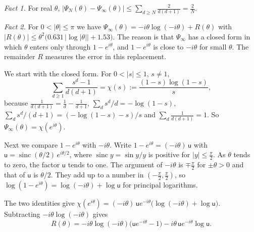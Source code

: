 \emph{Fact 1.} For real $\theta$,
$\lvert\Psi_N(\theta)-\Psi_\infty(\theta)\rvert\le\sum_{d\ge N}\frac2{d(d+1)}=\frac2N$.

\emph{Fact 2.} For $0<\lvert\theta\rvert\le\pi$ we have
$\Psi_\infty(\theta)=-i\theta\log(-i\theta)+R(\theta)$ with
$\lvert R(\theta)\rvert\le\theta^2\bigl(0.631\,\lvert\log\lvert\theta\rvert\rvert+1.53\bigr)$.
The reason is that $\Psi_\infty$ has a closed form in which $\theta$
enters only through $1-e^{i\theta}$, and $1-e^{i\theta}$ is close to
$-i\theta$ for small $\theta$. The remainder $R$ measures the error in this replacement.

We start with the closed form. For $0<\lvert s\rvert\le1$, $s\ne1$,
\[
 \sum_{d\ge1}\frac{s^d-1}{d(d+1)}=\chi(s):=\frac{(1-s)\log(1-s)}s,
\]
because $\frac1{d(d+1)}=\frac1d-\frac1{d+1}$, $\sum_ds^d/d=-\log(1-s)$,
$\sum_ds^d/(d+1)=(-\log(1-s)-s)/s$ and $\sum_d\frac1{d(d+1)}=1$. So
$\Psi_\infty(\theta)=\chi(e^{i\theta})$.

Next we compare $1-e^{i\theta}$ with $-i\theta$. Write
$1-e^{i\theta}=(-i\theta)\,\mathsf u$ with
$\mathsf u=\operatorname{sinc}(\theta/2)\,e^{i\theta/2}$, where
$\operatorname{sinc}y=\sin y/y$ is positive for $\lvert y\rvert\le\frac\pi2$.
As $\theta$ tends to zero, the factor $\mathsf u$ tends to one. The argument of
$-i\theta$ is $\mp\frac\pi2$ for $\pm\theta>0$ and that of $\mathsf u$ is
$\theta/2$. They add up to a number in $(-\frac\pi2,\frac\pi2)$, so
$\log(1-e^{i\theta})=\log(-i\theta)+\log\mathsf u$ for principal logarithms.

The two identities give
$\chi(e^{i\theta})=(-i\theta)\,\mathsf ue^{-i\theta}\bigl(\log(-i\theta)+\log\mathsf u\bigr)$.
Subtracting $-i\theta\log(-i\theta)$ gives
\[
 R(\theta)=-i\theta\log(-i\theta)\bigl(\mathsf ue^{-i\theta}-1\bigr)
 -i\theta\,\mathsf ue^{-i\theta}\log\mathsf u .
\]

